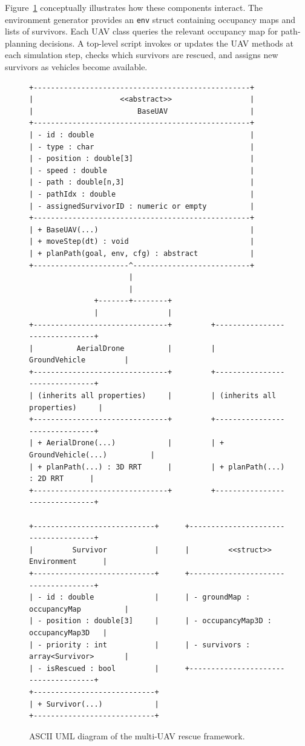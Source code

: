 \documentclass[12pt,a4paper]{report}
\begin{document}
Figure~\ref{fig:architectureDiagram} conceptually illustrates how these components
interact. The environment generator provides an \texttt{env} struct containing occupancy maps and
lists of survivors. Each UAV class queries the relevant occupancy map for path-planning decisions.
A top-level script invokes or updates the UAV methods at each simulation step, checks which survivors
are rescued, and assigns new survivors as vehicles become available.

\begin{figure}[ht]
\centering
\begin{verbatim}
+--------------------------------------------------+
|                    <<abstract>>                  |
|                        BaseUAV                   |
+--------------------------------------------------+
| - id : double                                    |
| - type : char                                    |
| - position : double[3]                           |
| - speed : double                                 |
| - path : double[n,3]                             |
| - pathIdx : double                               |
| - assignedSurvivorID : numeric or empty          |
+--------------------------------------------------+
| + BaseUAV(...)                                   |
| + moveStep(dt) : void                            |
| + planPath(goal, env, cfg) : abstract            |
+----------------------^---------------------------+
                       |
                       |
               +-------+--------+
               |                |
+-------------------------------+         +-------------------------------+
|          AerialDrone          |         |         GroundVehicle         |
+-------------------------------+         +-------------------------------+
| (inherits all properties)     |         | (inherits all properties)     |
+-------------------------------+         +-------------------------------+
| + AerialDrone(...)            |         | + GroundVehicle(...)          |
| + planPath(...) : 3D RRT      |         | + planPath(...) : 2D RRT      |
+-------------------------------+         +-------------------------------+

+----------------------------+      +-------------------------------------+
|         Survivor           |      |         <<struct>> Environment      |
+----------------------------+      +-------------------------------------+
| - id : double              |      | - groundMap : occupancyMap          |
| - position : double[3]     |      | - occupancyMap3D : occupancyMap3D   |
| - priority : int           |      | - survivors : array<Survivor>       |
| - isRescued : bool         |      +-------------------------------------+
+----------------------------+
| + Survivor(...)            |
+----------------------------+
\end{verbatim}
\caption{ASCII UML diagram of the multi-UAV rescue framework.}
\label{fig:architectureDiagram}
\end{figure}
\end{document}
